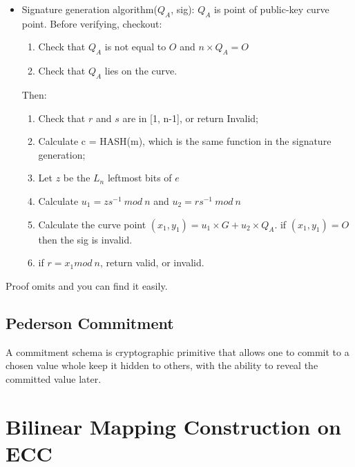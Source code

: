 \documentclass[a4paper,11pt]{article}
\begin{document}
\begin{itemize}
\item Signature generation algorithm($Q_A$, sig):  $Q_A$ is point of public-key curve point.
Before verifying, checkout: 
\begin{enumerate}
\item Check that $Q_A$ is not equal to $O$ and $n \times Q_A = O$
\item Check that $Q_A$ lies on the curve.
\end{enumerate}

Then:
\begin{enumerate}
\item Check that $r$ and $s$ are in [1, n-1], or return Invalid;
\item Calculate c = HASH(m), which is the same function in the signature generation;
\item Let $z$ be the $L_n$ leftmost bits of $e$
\item Calculate $u_1 = zs^{-1}\ mod\ n$  and $u_2 = rs^{-1}\ mod\ n$
\item Calculate the curve point $(x_1, y_1) =  u_1 \times G + u_2 \times Q_A$. if $(x_1, y_1) = O$ then the sig is invalid.
\item if $ r = x_1 mod\ n$, return valid, or invalid.
\end{enumerate}

\end{itemize}
Proof omits and you can find it easily. 

\subsection{Pederson Commitment}

A commitment schema is cryptographic primitive that allows one to commit to a chosen value whole keep it hidden to others, with the ability to reveal the committed value later.

\section{Bilinear Mapping Construction on ECC}





\end{document}
